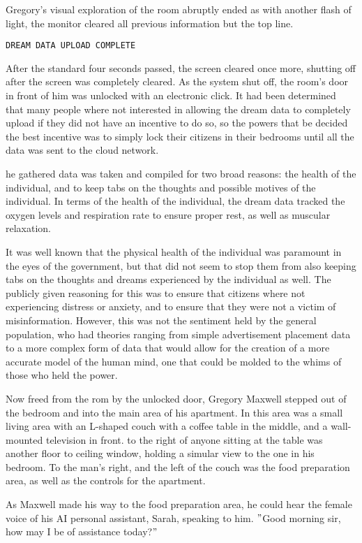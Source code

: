 Gregory’s visual exploration of the room abruptly ended as with another flash of light, the monitor cleared all previous information but the top line.
\begin{center}
\verb|DREAM DATA UPLOAD COMPLETE|
\end{center}
After the standard four seconds passed, the screen cleared once more, shutting off after the screen was completely cleared.
As the system shut off, the room’s door in front of him was unlocked with an electronic click.
It had been determined that many people where not interested in allowing the dream data to completely upload if they did
not have an incentive to do so, so the powers that be decided the best  incentive was to simply lock their citizens in their bedrooms until all the data was sent to the cloud network.

he gathered data was taken and compiled for two broad reasons: the health of the individual, and to keep tabs on the thoughts and possible motives of the individual.
In terms of the health of the individual, the dream data tracked the oxygen levels and respiration rate to ensure proper rest, as well as muscular relaxation.

It was well known that the physical health of the individual was paramount in the eyes of the government, but that did not
seem to stop them from also keeping tabs on the thoughts and dreams experienced by the individual as well.
The publicly given reasoning for this was to ensure that citizens where not experiencing distress or anxiety, and to ensure that they were not a victim of misinformation.
However, this was not the sentiment held by the general population, who had theories ranging from simple advertisement placement data to
a more complex form of data that would allow for the creation of a more accurate model of the human mind, one that could be molded to the whims of those who held the power.

Now freed from the rom by the unlocked door, Gregory Maxwell stepped out of the bedroom and into the main area of his apartment.
In this area was a small living area with an L-shaped couch with a coffee table in the middle, and a wall-mounted television in front.
to the right of anyone sitting at the table was another floor to ceiling window, holding a simular view to the one in his bedroom. %
To the man's right, and the left of the couch was the food preparation area, as well as the controls for the apartment.

As Maxwell made his way to the food preparation area, he could hear the female voice of his AI personal assistant, Sarah, speaking to him.
\("\)Good morning sir, how may I be of assistance today?\("\) %